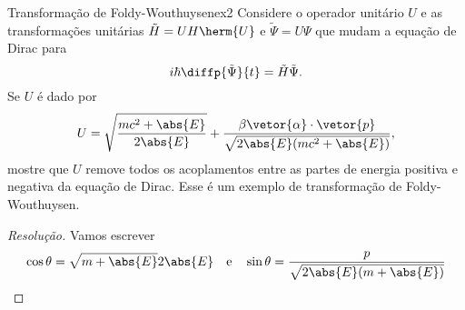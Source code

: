 \begin{exercício}{Transformação de Foldy-Wouthuysen}{ex2}
    Considere o operador unitário \(U\) e as transformações unitárias \(\tilde{H} = UH \herm{U}\) e \(\tilde{\Psi} = U\Psi\) que mudam a equação de Dirac para
    \begin{equation*}
        i\hbar \diffp{\tilde{\Psi}}{t} = \tilde{H} \tilde{\Psi}.
    \end{equation*}
    Se \(U\) é dado por
    \begin{equation*}
        U = \sqrt{\frac{mc^2 + \abs{E}}{2\abs{E}}} + \frac{\beta \vetor{\alpha}\cdot \vetor{p}}{\sqrt{2\abs{E}(mc^2 + \abs{E})}},
    \end{equation*}
    mostre que \(U\) remove todos os acoplamentos entre as partes de energia positiva e negativa da equação de Dirac. Esse é um exemplo de transformação de Foldy-Wouthuysen.
\end{exercício}
\begin{proof}[Resolução]
    Vamos escrever
    \begin{equation*}
        \cos\theta = \sqrt{m + \abs{E}}{2 \abs{E}}\quad\text{e}\quad
        \sin\theta = \frac{p}{\sqrt{2\abs{E}(m + \abs{E})}}
    \end{equation*}
\end{proof}
